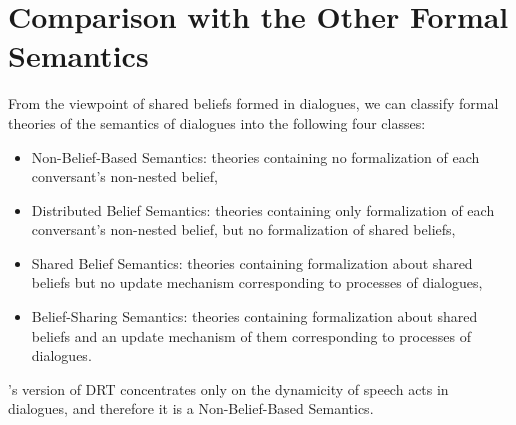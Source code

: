 \section{Comparison with the Other Formal Semantics}\label{comp}
From the viewpoint of shared beliefs formed in dialogues, we can classify formal theories of the semantics of dialogues into the following four classes: 
\begin{itemize}
\item Non-Belief-Based Semantics: theories containing no formalization of each conversant's non-nested belief,
\item Distributed Belief Semantics: theories containing only formalization of each conversant's non-nested belief, but no formalization of shared beliefs,
\item Shared Belief Semantics: theories containing formalization about shared beliefs but no update mechanism corresponding to processes of dialogues,
\item Belief-Sharing Semantics: theories containing formalization about shared beliefs and an update mechanism of them corresponding to processes of dialogues.
\end{itemize}
\cite{Gei95}'s version of DRT concentrates only on the dynamicity of speech acts in dialogues, and therefore it is a Non-Belief-Based Semantics.
